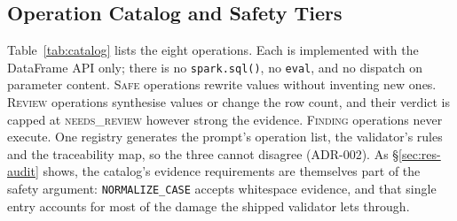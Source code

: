 \subsection{Operation Catalog and Safety Tiers}
Table~\ref{tab:catalog} lists the eight operations. Each is implemented with the DataFrame API only; there is no \texttt{spark.sql()}, no \texttt{eval}, and no dispatch on parameter content. \textsc{Safe} operations rewrite values without inventing new ones. \textsc{Review} operations synthesise values or change the row count, and their verdict is capped at \textsc{needs\_review} however strong the evidence. \textsc{Finding} operations never execute. One registry generates the prompt's operation list, the validator's rules and the traceability map, so the three cannot disagree (ADR-002). As \S\ref{sec:res-audit} shows, the catalog's evidence requirements are themselves part of the safety argument: \texttt{NORMALIZE\_CASE} accepts whitespace evidence, and that single entry accounts for most of the damage the shipped validator lets through.

\begin{table}[t]
\centering
\caption{Operation catalog (P0). Tier caps the best achievable verdict.}
\label{tab:catalog}
\scriptsize
\setlength{\tabcolsep}{3pt}
\end{table}

